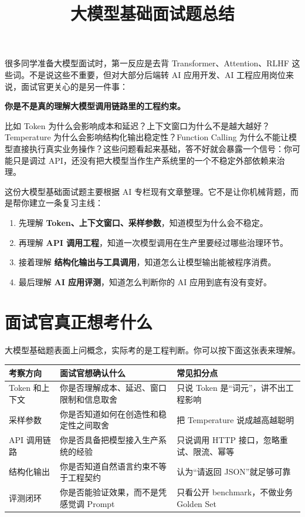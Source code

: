 \documentclass[10pt,a4paper]{ctexart}
\begin{document}
\title{大模型基础面试题总结}
\date{}
\maketitle

很多同学准备大模型面试时，第一反应是去背 Transformer、Attention、RLHF 这些词。不是说这些不重要，但对大部分后端转 AI 应用开发、AI 工程应用岗位来说，面试官更关心的是另一件事：



\textbf{你是不是真的理解大模型调用链路里的工程约束。}



比如 Token 为什么会影响成本和延迟？上下文窗口为什么不是越大越好？Temperature 为什么会影响结构化输出稳定性？Function Calling 为什么不能让模型直接执行真实业务操作？这些问题看起来基础，答不好就会暴露一个信号：你可能只是调过 API，还没有把大模型当作生产系统里的一个不稳定外部依赖来治理。



这份大模型基础面试题主要根据 AI 专栏现有文章整理。它不是让你机械背题，而是帮你建立一条复习主线：


\begin{enumerate}[itemsep=2pt, topsep=4pt]
  \item 先理解 \textbf{Token、上下文窗口、采样参数}，知道模型为什么会不稳定。
  \item 再理解 \textbf{API 调用工程}，知道一次模型调用在生产里要经过哪些治理环节。
  \item 接着理解 \textbf{结构化输出与工具调用}，知道怎么让模型输出能被程序消费。
  \item 最后理解 \textbf{AI 应用评测}，知道怎么判断你的 AI 应用到底有没有变好。
\end{enumerate}


\section{面试官真正想考什么}


大模型基础题表面上问概念，实际考的是工程判断。你可以按下面这张表来理解。


{\footnotesize
\begin{tabularx}{\textwidth}{|X|X|X|}
\hline
\textbf{考察方向} & \textbf{面试官想确认什么} & \textbf{常见扣分点} \\
\hline
Token 和上下文 & 你是否理解成本、延迟、窗口限制和信息取舍 & 只说 Token 是“词元”，讲不出工程影响 \\
\hline
采样参数 & 你是否知道如何在创造性和稳定性之间取舍 & 把 Temperature 说成越高越聪明 \\
\hline
API 调用链路 & 你是否具备把模型接入生产系统的经验 & 只说调用 HTTP 接口，忽略重试、限流、幂等 \\
\hline
结构化输出 & 你是否知道自然语言约束不等于工程契约 & 认为“请返回 JSON”就足够可靠 \\
\hline
评测闭环 & 你是否能验证效果，而不是凭感觉调 Prompt & 只看公开 benchmark，不做业务 Golden Set \\
\hline
\end{tabularx}
}
\end{document}
